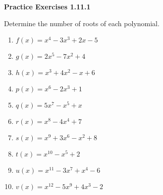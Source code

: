\vspace{0.3ex}
\noindent\textbf{Practice Exercises 1.11.1}

\vspace{0.2ex}

Determine the number of roots of each polynomial.
\begin{multicols}{2}
\begin{enumerate}
    \item \( f(x) = x^4 - 3x^3 + 2x - 5 \)
    \item \( g(x) = 2x^5 - 7x^2 + 4 \)
    \item \( h(x) = x^3 + 4x^2 - x + 6 \)
    \item  \( p(x) = x^6 - 2x^3 + 1 \)
    \item  \( q(x) = 5x^7 - x^5 + x \)
    \item  \( r(x) = x^8 - 4x^4 + 7 \)
    \item  \( s(x) = x^9 + 3x^6 - x^2 + 8 \)
    \item  \( t(x) = x^{10} - x^5 + 2 \)
    \item  \( u(x) = x^{11} - 3x^7 + x^4 - 6 \)
    \item  \( v(x) = x^{12} - 5x^9 + 4x^3 - 2 \)
\end{enumerate}
\end{multicols}

